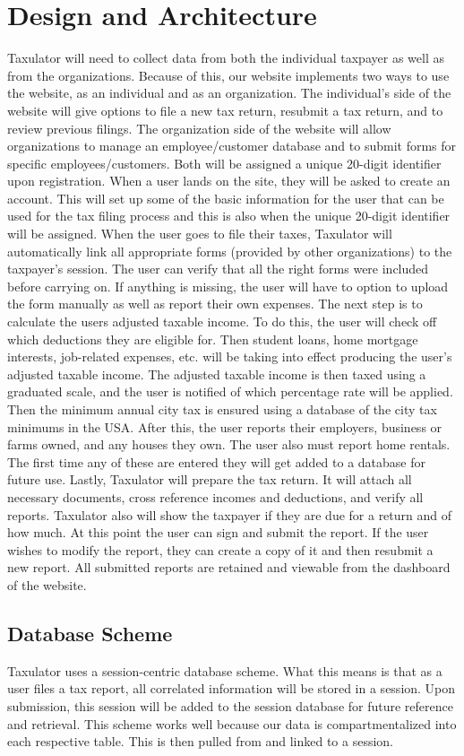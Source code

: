\documentclass[sigconf]{acmart}
\begin{document}
\section{Design and Architecture}
Taxulator will need to collect data from both the individual taxpayer as well as from the organizations. Because of this, our website implements two ways to use the website, as an individual and as an organization. The individual’s side of the website will give options to file a new tax return, resubmit a tax return, and to review previous filings. The organization side of the website will allow organizations to manage an employee/customer database and to submit forms for specific employees/customers. Both will be assigned a unique 20-digit identifier upon registration.
When a user lands on the site, they will be asked to create an account. This will set up some of the basic information for the user that can be used for the tax filing process and this is also when the unique 20-digit identifier will be assigned. When the user goes to file their taxes, Taxulator will automatically link all appropriate forms (provided by other organizations) to the taxpayer’s session. The user can verify that all the right forms were included before carrying on. If anything is missing, the user will have to option to upload the form manually as well as report their own expenses.
The next step is to calculate the users adjusted taxable income. To do this, the user will check off which deductions they are eligible for. Then student loans, home mortgage interests, job-related expenses, etc. will be taking into effect producing the user’s adjusted taxable income. The adjusted taxable income is then taxed using a graduated scale, and the user is notified of which percentage rate will be applied.
Then the minimum annual city tax is ensured using a database of the city tax minimums in the USA. After this, the user reports their employers, business or farms owned, and any houses they own. The user also must report home rentals. The first time any of these are entered they will get added to a database for future use.
Lastly, Taxulator will prepare the tax return. It will attach all necessary documents, cross reference incomes and deductions, and verify all reports. Taxulator also will show the taxpayer if they are due for a return and of how much. At this point the user can sign and submit the report.
If the user wishes to modify the report, they can create a copy of it and then resubmit a new report. All submitted reports are retained and viewable from the dashboard of the website.
\subsection{Database Scheme}
Taxulator uses a session-centric database scheme. What this means is that as a user files a tax report, all correlated information will be stored in a session. Upon submission, this session will be added to the session database for future reference and retrieval.
This scheme works well because our data is compartmentalized into each respective table. This is then pulled from and linked to a session.
\end{document}
